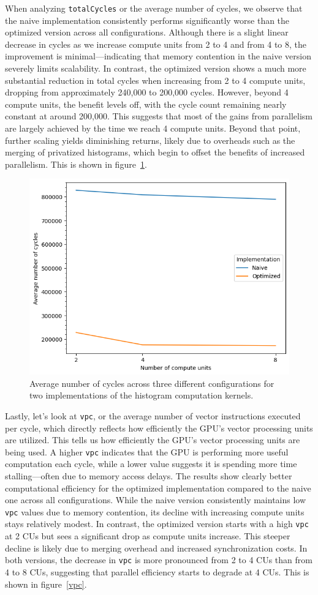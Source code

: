 \documentclass[10pt]{article}
\begin{document}
When analyzing \texttt{totalCycles} or the average number of cycles, we observe that the naive implementation consistently performs significantly worse than the optimized version across all configurations. Although there is a slight linear decrease in cycles as we increase compute units from 2 to 4 and from 4 to 8, the improvement is minimal—indicating that memory contention in the naive version severely limits scalability. In contrast, the optimized version shows a much more substantial reduction in total cycles when increasing from 2 to 4 compute units, dropping from approximately 240,000 to 200,000 cycles. However, beyond 4 compute units, the benefit levels off, with the cycle count remaining nearly constant at around 200,000. This suggests that most of the gains from parallelism are largely achieved by the time we reach 4 compute units. Beyond that point, further scaling yields diminishing returns, likely due to overheads such as the merging of privatized histograms, which begin to offset the benefits of increased parallelism. This is shown in figure~\ref{fig:task1:avg-cycles}.

\begin{figure}[htbp]
    \centering
    \includegraphics[width=0.6\linewidth]{images/task1/rs4-t1-avg-cycles.png}
    \caption{Average number of cycles across three different configurations for two implementations of the histogram computation kernels.}
    \label{fig:task1:avg-cycles}
\end{figure}

Lastly, let’s look at \texttt{vpc}, or the average number of vector instructions executed per cycle, which directly reflects how efficiently the GPU’s vector processing units are utilized. This tells us how efficiently the GPU's vector processing units are being used. A higher \texttt{vpc} indicates that the GPU is performing more useful computation each cycle, while a lower value suggests it is spending more time stalling—often due to memory access delays.
The results show clearly better computational efficiency for the optimized implementation compared to the naive one across all configurations. While the naive version consistently maintains low \texttt{vpc} values due to memory contention, its decline with increasing compute units stays relatively modest. In contrast, the optimized version starts with a high \texttt{vpc} at 2 CUs but sees a significant drop as compute units increase. This steeper decline is likely due to merging overhead and increased synchronization costs. In both versions, the decrease in \texttt{vpc} is more pronounced from 2 to 4 CUs than from 4 to 8 CUs, suggesting that parallel efficiency starts to degrade at 4 CUs. This is shown in figure~\ref{vpc}.
\end{document}
